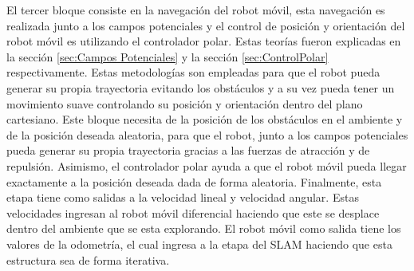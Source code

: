 El tercer bloque consiste en la navegación del robot móvil, esta navegación es realizada 
junto a los campos potenciales y el control de posición y orientación del robot móvil es 
utilizando el controlador polar. Estas teorías fueron explicadas en la sección 
\ref{sec:Campos Potenciales} y la sección \ref{sec:ControlPolar} respectivamente. Estas 
metodologías son empleadas para que el robot pueda generar su propia trayectoria evitando
los obstáculos y a su vez pueda tener un movimiento suave controlando su posición y 
orientación dentro del plano cartesiano. Este bloque necesita de la posición de los obstáculos
en el ambiente y de la posición deseada aleatoria, para que el robot, junto a los campos
potenciales pueda generar su propia trayectoria gracias a las fuerzas de atracción y 
de repulsión. Asimismo, el controlador polar ayuda a que el robot móvil pueda llegar exactamente
a la posición deseada dada de forma aleatoria. Finalmente, esta etapa tiene como salidas 
a la velocidad lineal y velocidad angular. Estas velocidades ingresan al robot móvil diferencial
haciendo que este se desplace dentro del ambiente que se esta explorando. El robot móvil como
salida tiene los valores de la odometría, el cual ingresa a la etapa del SLAM haciendo que 
esta estructura sea de forma iterativa.





